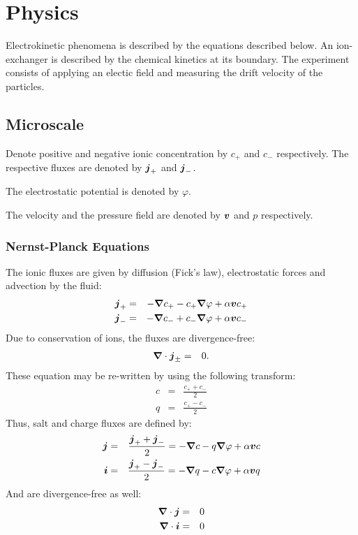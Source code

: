 \section{Physics}
Electrokinetic phenomena is described by the equations described below.
An ion-exchanger is described by the chemical kinetics at its boundary.
The experiment consists of applying an electic field and measuring the drift velocity of the particles.

\subsection{Microscale}
Denote positive and negative ionic concentration by $c_+$ and $c_-$ respectively.
The respective fluxes are denoted by $\boldsymbol{j}_+$ and $\boldsymbol{j}_-$.

The electrostatic potential is denoted by $\varphi$. 

The velocity and the pressure field are denoted by $\boldsymbol{v}$ and $p$ respectively.

\subsubsection{Nernst-Planck Equations}
The ionic fluxes are given by diffusion (Fick's law), electrostatic forces and advection by the fluid:
\begin{eqnarray}
 \nonumber \boldsymbol{j}_+ &=& -\boldsymbol{\nabla} c_+ - c_+ \boldsymbol{\nabla} \varphi + \alpha \boldsymbol{v} c_+ \\
 \nonumber \boldsymbol{j}_- &=& -\boldsymbol{\nabla} c_- + c_- \boldsymbol{\nabla} \varphi + \alpha \boldsymbol{v} c_-
\end{eqnarray}
Due to conservation of ions, the fluxes are divergence-free:
\begin{eqnarray}
\boldsymbol{\nabla} \cdot \boldsymbol{j}_\pm &=& 0.
\end{eqnarray}
These equation may be re-written by using the following transform:
\begin{eqnarray}
 \nonumber c &=& \frac{c_+ + c_-}{2}\\
 \nonumber q &=& \frac{c_+ - c_-}{2}
\end{eqnarray}
Thus, salt and charge fluxes are defined by:
\begin{eqnarray}
 \nonumber \boldsymbol{j} &=& \frac{\boldsymbol{j}_+ + \boldsymbol{j}_-}{2} = -\boldsymbol{\nabla} c - q \boldsymbol{\nabla} \varphi + \alpha \boldsymbol{v} c \\
 \nonumber \boldsymbol{i} &=& \frac{\boldsymbol{j}_+ - \boldsymbol{j}_-}{2} = -\boldsymbol{\nabla} q - c \boldsymbol{\nabla} \varphi + \alpha \boldsymbol{v} q
\end{eqnarray}
And are divergence-free as well:
\begin{eqnarray}
\boldsymbol{\nabla} \cdot \boldsymbol{j} &=& 0 \\
\boldsymbol{\nabla} \cdot \boldsymbol{i} &=& 0 
\end{eqnarray}

